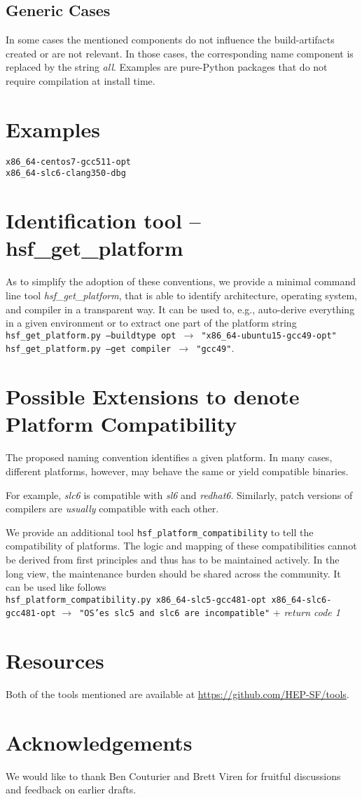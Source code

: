 \documentclass[12pt,a4paper]{article}
\begin{document}
\subsection{Generic Cases}
In some cases the mentioned components do not influence the build-artifacts created or are not relevant. In those cases, the corresponding name component is replaced by the string \emph{all}. Examples are pure-Python packages that do not require compilation at install time.


\section{Examples}
\texttt{x86\_64-centos7-gcc511-opt}
\\
\texttt{x86\_64-slc6-clang350-dbg}


\section{Identification tool -- hsf\_get\_platform}
As to simplify the adoption of these conventions, we provide a minimal command line tool \emph{hsf\_get\_platform}, that is able to identify architecture, operating system, and compiler in a transparent way. It can be used to, e.g., auto-derive everything in a given environment or to extract one part of the platform string
\\
\texttt{hsf\_get\_platform.py --buildtype opt $\rightarrow$ "x86\_64-ubuntu15-gcc49-opt"}
\\
\texttt{hsf\_get\_platform.py --get compiler $\rightarrow$ "gcc49"}.

\section{Possible Extensions to denote Platform Compatibility}
The proposed naming convention identifies a given platform. In many cases, different platforms, however, may behave the same or yield compatible binaries. 

For example, \emph{slc6} is compatible with \emph{sl6} and \emph{redhat6}. Similarly, patch versions of compilers are \emph{usually} compatible with each other.

We provide an additional tool \texttt{hsf\_platform\_compatibility} to tell the compatibility of platforms. The logic and mapping of these compatibilities cannot be derived from first principles and thus has to be maintained actively. In the long view, the maintenance burden should be shared across the community. It can be used like follows
\\
\newline
\texttt{hsf\_platform\_compatibility.py x86\_64-slc5-gcc481-opt x86\_64-slc6-gcc481-opt}
\newline 
\texttt{$\rightarrow$ "OS'es slc5 and slc6 are incompatible"} + \emph{return code 1}

\section{Resources}
Both of the tools mentioned are available at \url{https://github.com/HEP-SF/tools}. 

\section*{Acknowledgements}
We would like to thank Ben Couturier and Brett Viren for fruitful discussions and feedback on earlier drafts.
\end{document}
